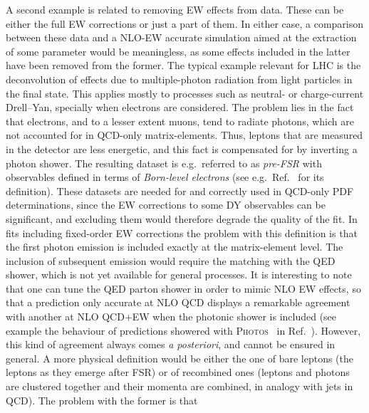 
A second example is related to removing EW effects from data. These can be either the full EW corrections
or just a part of them. In either case, a comparison between these data and a NLO-EW accurate simulation aimed at the extraction of some parameter would be meaningless, as some effects included in the latter
have been removed from the former. The typical example relevant for LHC is the deconvolution of effects due to multiple-photon radiation
from light particles in the final state. This applies mostly
to processes such as neutral- or charge-current Drell--Yan, specially when electrons are considered. The problem lies in the fact that
 electrons, and to a lesser extent muons, tend to radiate photons, which are not accounted
for in QCD-only matrix-elements. Thus, leptons that are measured in the detector are less energetic, and this fact is compensated for
by inverting a photon shower. The resulting dataset is e.g.\ referred to as \emph{pre-FSR} with observables defined in terms of \emph{Born-level electrons} (see e.g.\ Ref.~\cite{Aad:2015auj} for its definition).
These datasets are needed for and correctly used in QCD-only PDF determinations, since the EW corrections to some DY observables can be significant, and excluding them would therefore degrade the quality of the fit.
In fits including fixed-order EW corrections the problem with this definition is that the first photon emission is included exactly at the matrix-element level. The inclusion of
subsequent emission would require the matching with the QED shower, which is not yet available for general processes. It is interesting
to note that one can tune the QED parton shower in order to mimic NLO EW effects, so that a prediction only accurate at NLO
QCD displays a remarkable agreement with another at NLO QCD+EW when the photonic shower is included (see example the behaviour of predictions showered with
\textsc{Photos}~\cite{Barberio:1990ms,Barberio:1993qi,Golonka:2005pn} in Ref.~\cite{CarloniCalame:2016ouw}). However, this kind of agreement
always comes \emph{a posteriori}, and cannot be ensured in general. A more physical definition would be either the one of bare leptons (the leptons as they emerge after FSR)
or of recombined ones (leptons and photons are clustered together and their momenta are combined, in analogy with jets in QCD). The problem with the former is that 
